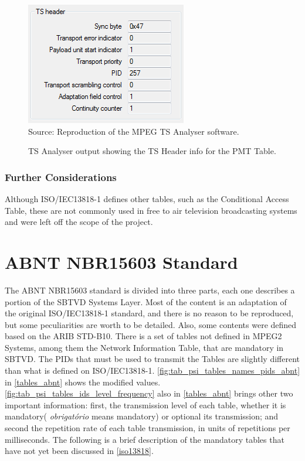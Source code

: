 \documentclass[
	12pt,				%
	openright,			%
	twoside,			%
	a4paper,			%
	brazil,
	french,				%
	english
	]{abntex2}
\begin{document}
\begin{figure}[!hb]
\centering
\caption{TS Analyser output showing the TS Header info for the PMT Table.}
\includegraphics[width=0.4\linewidth]{figuras/TSAnalyser_close_PMT_TS_Header.png}
\\Source: Reproduction of the MPEG TS Analyser software.
\label{fig:TSAnalyser_close_PMT_TS_Header}
\end{figure}

\subsection{Further Considerations}

Although ISO/IEC13818-1 defines other tables, such as the Conditional Access Table, these are not commonly used in free to air television broadcasting systems\cite{} and were left off the scope of the project.

\chapter{ABNT NBR15603 Standard}
\label{nbr15603}

The ABNT NBR15603 standard is divided into three parts, each one describes a portion of the SBTVD Systems Layer. Most of the content is an adaptation of the original ISO/IEC13818-1 standard, and there is no reason to be reproduced, but some peculiarities are worth to be detailed. Also, some contents were defined based on the ARIB STD-B10. There is a set of tables not defined in MPEG2 Systems, among them the Network Information Table, that are mandatory in SBTVD. The PIDs that must be used to transmit the Tables are slightly different than what is defined on ISO/IEC13818-1. \autoref{fig:tab_psi_tables_names_pids_abnt} in \autoref{tables_abnt} shows the modified values. \autoref{fig:tab_psi_tables_ids_level_frequency} also in \autoref{tables_abnt} brings other two important information: first, the transmission level of each table, whether it is mandatory( \textit{obrigatório} means mandatory) or optional its transmission; and second the repetition rate of each table transmission, in units of repetitions per milliseconds. The following is a brief description of the mandatory tables that have not yet been discussed in \autoref{iso13818}.
\end{document}
